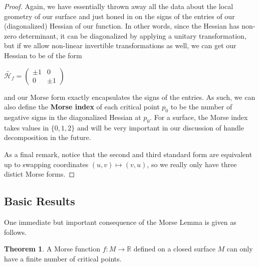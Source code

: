 \documentclass[12pt]{article}
\newcommand{\cH}{{\mathcal H}}
\newcommand{\bR}{{\mathbb R}}
\theoremstyle{definition}
\newtheorem{theorem}{Theorem}
\begin{document}
\begin{proof}
	Again, we have essentially thrown away all the data about the local geometry of our surface and just honed in on the signs of the entries of our (diagonalized) Hessian of our function. In other words, since the Hessian has non-zero determinant, it can be diagonalized by applying a unitary transformation, but if we allow non-linear invertible transformations as well, we can get our Hessian to be of the form 
	\begin{center}
		$\tilde{\cH_f} = \begin{pmatrix}
			\pm 1 & 0  \\
			0 & \pm 1 
			\end{pmatrix}$
	\end{center}
	and our Morse form exactly encapsulates the signs of the entries. As such, we can also define the \textbf{Morse index} of each critical point $p_0$ to be the number of negative signs in the diagonalized Hessian at $p_0$. For a surface, the Morse index takes values in $\{0,1,2\}$ and will be very important in our discussion of handle decomposition in the future. 
	
	As a final remark, notice that the second and third standard form are equivalent up to swapping coordinates $(u,v)\mapsto (v,u)$, so we really only have three distict Morse forms. 
\end{proof}


\subsection{Basic Results}

One immediate but important consequence of the Morse Lemma is given as follows. 

\begin{theorem}
	A Morse function $f:M\rightarrow \bR$ defined on a closed surface $M$ can only have a finite number of critical points.
\end{theorem}
\end{document}
